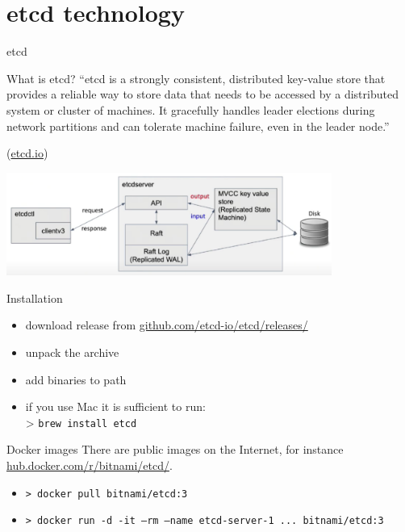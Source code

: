 \documentclass[presentation]{beamer}\mode<presentation>{\usetheme{AMSBolognaFC}}
\begin{document}
\section{etcd technology}

\begin{frame}[allowframebreaks]{etcd}
	\begin{block}{What is etcd?}
		``etcd is a strongly consistent, \alert{distributed key-value store} that provides a reliable way to store data that needs to be accessed by a distributed system or cluster of machines.
        It gracefully handles leader elections during network partitions and can tolerate machine failure, even in the leader node.''
        \begin{flushright}
            (\href{https://etcd.io/}{etcd.io})
        \end{flushright}
	\end{block}
    
    \centering
    \includegraphics[width=0.8\textwidth]{figures/etcd.png}
    
    \framebreak
    
    \begin{block}{Installation}
        \begin{itemize}
            \item download release from \href{https://github.com/etcd-io/etcd/releases/}{github.com/etcd-io/etcd/releases/}
            \item unpack the archive
            \item add binaries to path
            \item if you use Mac it is sufficient to run:\\
            > \texttt{brew install etcd}
        \end{itemize}
    \end{block}
    
    \begin{block}{Docker images}
        There are public images on the Internet, for instance \href{https://hub.docker.com/r/bitnami/etcd/}{hub.docker.com/r/bitnami/etcd/}.
        \begin{itemize}
            \item \texttt{> docker pull bitnami/etcd:3}
            \item \texttt{> docker run -d -it --rm --name etcd-server-1 ... bitnami/etcd:3}
        \end{itemize}
    \end{block}


\end{frame}
\end{document}
